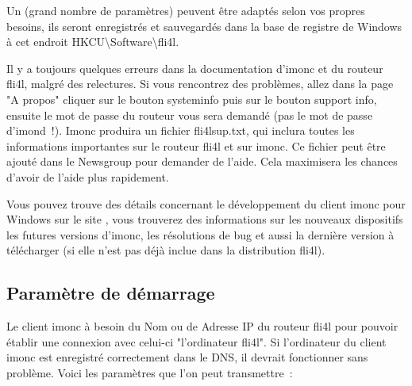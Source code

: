   Un (grand nombre de paramètres) peuvent être adaptés selon vos propres besoins,
  ils seront enregistrés et sauvegardés dans la base de registre de Windows à cet
  endroit HKCU{\textbackslash}Software{\textbackslash}fli4l.

  Il y a toujours quelques erreurs dans la documentation d'imonc et du routeur
  fli4l, malgré des relectures. Si vous rencontrez des problèmes, allez dans la
  page "A propos" cliquer sur le bouton systeminfo puis sur le bouton support info,
  ensuite le mot de passe du routeur vous sera demandé (pas le mot de passe d'imond~!).
  Imonc produira un fichier fli4lsup.txt, qui inclura toutes les informations
  importantes sur le routeur fli4l et sur imonc. Ce fichier peut être ajouté
  dans le Newsgroup pour demander de l'aide. Cela maximisera les chances
  d'avoir de l'aide plus rapidement.

  Vous pouvez trouve des détails concernant le développement du client imonc pour
  Windows sur le site , vous trouverez des informations
  sur les nouveaux dispositifs les futures versions d'imonc, les résolutions de bug
  et aussi la dernière version à télécharger (si elle n'est pas déjà inclue dans
  la distribution fli4l).

  \subsection{Paramètre de démarrage}

  Le client imonc à besoin du Nom ou de Adresse IP du routeur fli4l pour pouvoir
  établir une connexion avec celui-ci "l'ordinateur fli4l". Si l'ordinateur du client
  imonc est enregistré correctement dans le DNS, il devrait fonctionner sans problème.
  Voici les paramètres que l'on peut transmettre~: 

